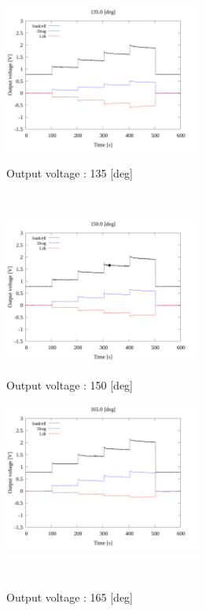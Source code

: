 \begin{figure}[htbp]
\begin{minipage}[b]{0.45\linewidth}
        \centering
        \includegraphics[width=65mm]{../../02_workspace/result/2-1/plot/01-3_allsensors/01_allsensors_1350.png}
        \caption{Output voltage : 135 [deg]}
      \end{minipage}\\
      \begin{minipage}[b]{0.45\linewidth}
        \centering
        \includegraphics[width=65mm]{../../02_workspace/result/2-1/plot/01-3_allsensors/01_allsensors_1500.png}
        \caption{Output voltage : 150 [deg]}
      \end{minipage} 
      \begin{minipage}[b]{0.45\linewidth}
        \centering
        \includegraphics[width=65mm]{../../02_workspace/result/2-1/plot/01-3_allsensors/01_allsensors_1650.png}
        \caption{Output voltage : 165 [deg]}
      \end{minipage}\\
\end{figure}

